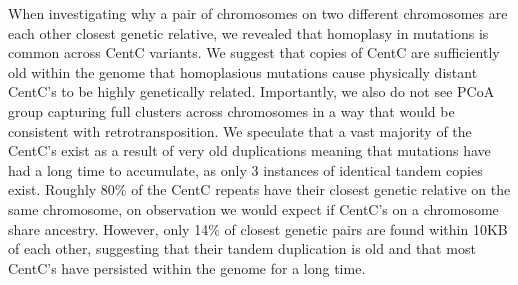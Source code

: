 When investigating why a pair of chromosomes on two different chromosomes are each other closest genetic relative, we revealed that homoplasy in mutations is common across CentC variants.  We suggest that copies of CentC are sufficiently old within the genome that  homoplasious mutations cause physically distant CentC’s to be highly genetically related.  Importantly, we also do not see PCoA group capturing full clusters across chromosomes in a way that would be consistent with  retrotransposition.  We speculate that a vast majority of the CentC’s exist as a result of very old duplications meaning that mutations have had a long time to accumulate, as only 3 instances of identical tandem copies exist. Roughly 80\% of the CentC repeats have their closest genetic relative on the same chromosome, on observation we would expect if CentC’s on a chromosome share ancestry.  However, only 14\% of closest genetic pairs are found within 10KB of each other, suggesting that their tandem duplication is old and that most CentC’s have persisted within the genome for a long time. 


